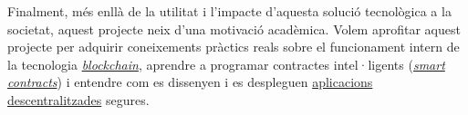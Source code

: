 Finalment, més enllà de la utilitat i l'impacte d'aquesta solució tecnològica a la societat, aquest projecte neix d'una motivació acadèmica. Volem aprofitar aquest projecte per adquirir coneixements pràctics reals sobre el funcionament intern de la tecnologia \hyperlink{def:blockchain}{\textit{blockchain}}, aprendre a programar contractes intel·ligents (\hyperlink{def:smartcontract}{\textit{smart contracts}}) \cite{buterin} i entendre com es dissenyen i es despleguen \hyperlink{def:dapp}{aplicacions descentralitzades} segures.